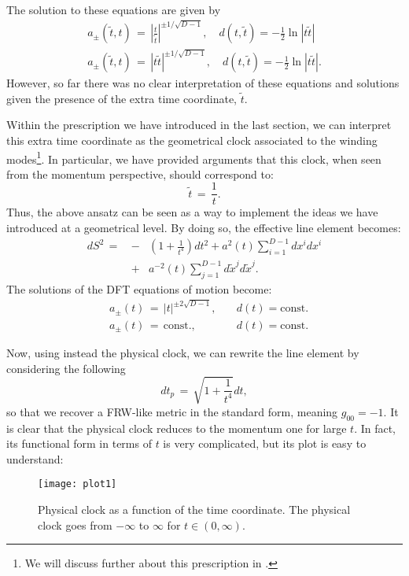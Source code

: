 \documentclass[prd, aps, superscriptaddress, preprintnumbers, twocolumn, floatfix, nofootinbib]{revtex4}
\begin{document}
The solution to these equations are given by
\begin{eqnarray}
a_\pm (\tilde{t},t) \, =
\, \left|\frac{t}{\tilde{t}}\right|^{\pm 1/\sqrt{D-1}}, \quad d(t,\tilde{t}) = -\frac{1}{2} \ln{|t\tilde{t}|} \\
a_\pm (\tilde{t},t) \, =
\, \left|t\tilde{t}\right|^{\pm 1/\sqrt{D-1}}, \quad d(t,\tilde{t}) = -\frac{1}{2} \ln{|t\tilde{t}|}.
\end{eqnarray}
However, so far there was no clear interpretation of these equations and solutions given the presence
of the extra time coordinate, $\tilde{t}$.

Within the prescription we have introduced in the last section, we can interpret this extra time coordinate
as the geometrical clock associated to the winding modes\footnote{We will discuss further about this prescription in \cite{DFTbackground}.}. In particular, we have provided
arguments that this clock, when seen from the momentum perspective, should correspond to:
\begin{equation}
    \tilde{t} \, = \, \frac{1}{t}.
\end{equation}
Thus, the above ansatz can be seen as a way to implement the ideas we have introduced at a
geometrical level. By doing so, the effective line element becomes:
\begin{eqnarray}
dS^2 \, = \, &-&\left(1+\frac{1}{t^4}\right) dt^2  +a^2(t) \sum_{i=1}^{D-1}  dx^i dx^i
\nonumber\\
&+& a^{-2}(t)\sum^{D-1}_{j=1}  d\tilde{x}^j d\tilde{x}^j.
\end{eqnarray}
The solutions of the DFT equations of motion become:
\begin{align}
&a_\pm (t) \, = \, |t|^{\pm 2\sqrt{D-1}}, \quad &d(t) = \text{const.} \\
&a_\pm (t) \, = \, \text{const.}, \quad &d(t) =\text{const.} \label{eq:non_trivial}
\end{align}

Now, using instead the physical clock, we can rewrite the line element by considering the following
\begin{equation}
dt_{p} \, = \, \sqrt{1+\frac{1}{t^{4}}}dt,
\end{equation}
so that we recover a FRW-like metric in the standard form, meaning $g_{00}=-1$. It is clear
that the physical clock reduces to the momentum one for large $t$. In fact, its functional
form in terms of $t$ is very complicated, but its plot is easy to understand:
\begin{figure}[H]
\begin{centering}
\texttt{[image: plot1]}
\par\end{centering}
\caption{Physical clock as a function of the time coordinate. The physical clock goes from $-\infty$ to $\infty$ for $t\in(0,\infty)$.}
\end{figure}
\end{document}

